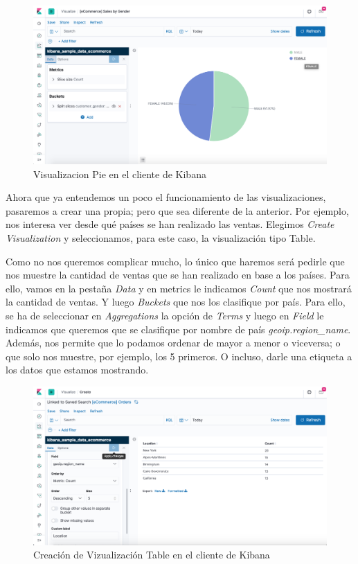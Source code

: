 \documentclass[a4paper, 12pt]{book}
\begin{document}
\begin{figure}[H]
  \centering
  \includegraphics[width=12cm, keepaspectratio]{img/development/Kibana-visualization-pie.png}
  \caption{Visualizacion Pie en el cliente de Kibana}
  \label{fig:Kibanapie}
\end{figure}

Ahora que ya entendemos un poco el funcionamiento de las visualizaciones, pasaremos a crear una propia; pero que sea diferente de la anterior. Por ejemplo, nos interesa ver desde qué países se han realizado las ventas. Elegimos \textit{Create Visualization} y seleccionamos, para este caso, la visualización tipo Table. 

Como no nos queremos complicar mucho, lo único que haremos será pedirle que nos muestre la cantidad de ventas que se han realizado en base a los países. Para ello, vamos en la pestaña \textit{Data} y en metrics le indicamos \textit{Count} que nos mostrará la cantidad de ventas. Y luego \textit{Buckets} que nos los clasifique por país. Para ello, se ha de seleccionar en \textit{Aggregations} la opción de \textit{Terms} y luego en \textit{Field} le indicamos que queremos que se clasifique por nombre de país \textit{geoip.region\_name}. Además, nos permite que lo podamos ordenar de mayor a menor o viceversa; o que solo nos muestre, por ejemplo, los 5 primeros. O incluso, darle una etiqueta a los datos que estamos mostrando.

\begin{figure}[H]
  \centering
  \includegraphics[width=12cm, keepaspectratio]{img/development/kibana-table-editor.png}
  \caption{Creación de Vizualización Table en el cliente de Kibana}
  \label{fig:Kibanatable}
\end{figure}
\end{document}
